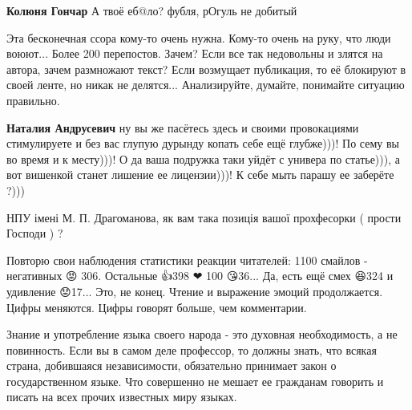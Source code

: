 \begin{itemize}
\begin{itemize}
\begin{itemize}
\textbf{Колюня Гончар} А твоё еб@ло? фубля, рОгуль не добитый🤣
\end{itemize}



Эта бесконечная ссора кому-то очень нужна. Кому-то очень на руку, что люди
воюют... Более 200 перепостов. Зачем? Если все так недовольны и злятся на
автора, зачем размножают текст? Если возмущает публикация, то её блокируют в
своей ленте, но никак не делятся... Анализируйте, думайте, понимайте ситуацию
правильно.

\begin{itemize}

\textbf{Наталия Андрусевич} ну вы же пасётесь здесь и своими провокациями стимулируете и без вас глупую дурынду копать себе ещё глубже)))! По сему вы во время и к месту)))! О да ваша подружка таки уйдёт с универа по статье))), а вот вишенкой станет лишение ее лицензии)))! К себе мыть парашу ее заберёте ?)))
\end{itemize}


НПУ імені М. П. Драгоманова, як вам така позиція вашої прохфесорки ( прости Господи ) ?



Повторю свои наблюдения статистики реакции читателей: 1100 смайлов - негативных
😡 306. Остальные 👍398 ❤ 100 😘36... Да, есть ещё смех 😆324 и удивление
😟17... Это, не конец. Чтение и выражение эмоций продолжается. Цифры меняются.
Цифры говорят больше, чем комментарии.




Знание и употребление языка своего народа - это духовная необходимость, а не
повинность. Если вы в самом деле профессор, то должны знать, что всякая страна,
добившаяся независимости, обязательно принимает закон о государственном языке.
Что совершенно не мешает ее гражданам говорить и писать на всех прочих
известных миру языках.


\end{itemize}
\end{itemize}
